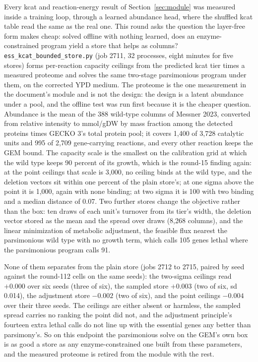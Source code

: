 Every kcat and reaction-energy result of Section~\ref{sec:module} was measured inside a
training loop, through a learned abundance head, where the shuffled kcat table read the
same as the real one. This round asks the question the layer-free form makes cheap:
solved offline with nothing learned, does an enzyme-constrained program yield a store
that helps as columns? \texttt{ess\_kcat\_bounded\_store.py} (job 2711, 32 processes,
eight minutes for five stores) forms per-reaction capacity ceilings from the predicted
kcat tier times a measured proteome and solves the same two-stage parsimonious program
under them, on the corrected YPD medium. The proteome is the one measurement in the
document's module and is not the design: the design is a latent abundance under a pool,
and the offline test was run first because it is the cheaper question. Abundance is the
mean of the 388 wild-type columns of Messner 2023, converted from relative intensity to
mmol/gDW by mass fraction among the detected proteins times GECKO 3's total protein
pool; it covers 1,400 of 3,728 catalytic units and 995 of 2,709 gene-carrying reactions,
and every other reaction keeps the GEM bound. The capacity scale is the smallest on the
calibration grid at which the wild type keeps 90 percent of its growth, which is the
round-15 finding again: at the point ceilings that scale is 3,000, no ceiling binds at
the wild type, and the deletion vectors sit within one percent of the plain store's; at
one sigma above the point it is 1,000, again with none binding; at two sigma it is 100
with two binding and a median distance of 0.07. Two further stores change the objective
rather than the box: ten draws of each unit's turnover from its tier's width, the
deletion vector stored as the mean and the spread over draws (8,268 columns), and the
linear minimization of metabolic adjustment, the feasible flux nearest the parsimonious
wild type with no growth term, which calls 105 genes lethal where the parsimonious
program calls 91.

None of them separates from the plain store (jobs 2712 to 2715, paired by seed against
the round-112 cells on the same seeds): the two-sigma ceilings read $+0.000$ over six
seeds (three of six), the sampled store $+0.003$ (two of six, sd 0.014), the adjustment
store $-0.002$ (two of six), and the point ceilings $-0.004$ over their three seeds. The
ceilings are either absent or harmless, the sampled spread carries no ranking the point
did not, and the adjustment principle's fourteen extra lethal calls do not line up with
the essential genes any better than parsimony's. So on this endpoint the parsimonious
solve on the GEM's own box is as good a store as any enzyme-constrained one built from
these parameters, and the measured proteome is retired from the module with the rest.


